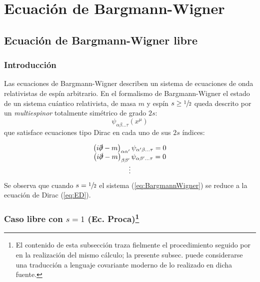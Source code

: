 \chapter{Ecuación de Bargmann-Wigner}
\label{chap:EcBargmannWigner}

\section{Ecuación de Bargmann-Wigner libre}
\label{EBWL}

\subsection{Introducción}
\label{sec:IntroEBW}

Las ecuaciones de Bargmann-Wigner\cite{BargmannWigner} describen un sistema de ecuaciones de onda relativistas de espín arbitrario. 
En el formalismo de Bargmann-Wigner el estado de un sistema cuántico relativista, de masa $m$ y espín $s\geq \sfrac{1}{2}$ queda descrito por un \textit{multiespinor} totalmente simétrico de grado $2s$: \citep{Lurie,GreinerRQM}
$$ \psi_{\alpha \beta \ldots \tau}(x^{\mu})$$
que satisface ecuaciones tipo Dirac en cada uno de sus $2s$ índices:

\begin{equation}\label{eq:BargmannWigner}
\begin{array}{c}
\left(i\slashed{\partial}-m \right)_{\alpha \alpha'}\psi_{\alpha' \beta \ldots \tau}=0\\
\left(i\slashed{\partial}-m \right)_{\beta \beta'}\psi_{\alpha \beta' \ldots \tau}=0\\
\vdots \\
\end{array}
\end{equation}
Se observa que cuando $s=\sfrac{1}{2}$ el sistema (\ref{eq:BargmannWigner}) se reduce a la ecuación de Dirac (\ref{eq:ED}).

\subsection[Caso libre con \texorpdfstring{$s=1$}{s=1} (Ec. Proca)]{Caso libre con \texorpdfstring{$s=1$}{s=1} (Ec. Proca)\footnote[$\dagger$]{El contenido de esta subsección traza fielmente el procedimiento seguido por \citep{Lurie} en la realización del mismo cálculo; la presente subsec. puede considerarse una traducción a lenguaje covariante moderno de lo realizado en dicha fuente.}}
\label{subsec:EBWs1}


